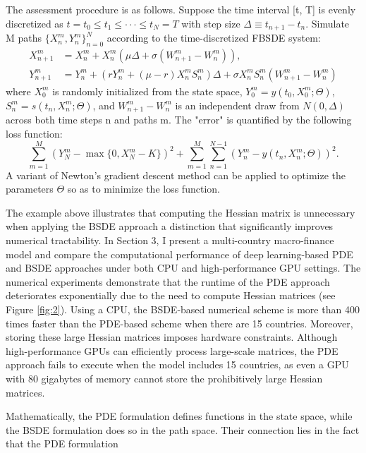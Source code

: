 \documentclass{article}
\begin{document}
The assessment procedure is as follows. Suppose the time interval [t, T] is evenly discretized as $t=t_{0}\le t_{1}\le\cdot\cdot\cdot\le t_{N}=T$ with step size $\Delta\equiv t_{n+1}-t_{n}$. Simulate M paths $\{X_{n}^{m},Y_{n}^{m}\}_{n=0}^{N}$ according to the time-discretized FBSDE system:
\begin{align*}
X_{n+1}^{m}&=X_{n}^{m}+X_{n}^{m}(\mu\Delta+\sigma(W_{n+1}^{m}-W_{n}^{m})), \\
Y_{n+1}^{m}&=Y_{n}^{m}+(rY_{n}^{m}+(\mu-r)X_{n}^{m}S_{n}^{m})\Delta+\sigma X_{n}^{m}S_{n}^{m}(W_{n+1}^{m}-W_{n}^{m})
\end{align*}
where $X_{0}^{m}$ is randomly initialized from the state space, $Y_{0}^{m}=y(t_{0},X_{0}^{m};\Theta)$, $S_{n}^{m}=s(t_{n},X_{n}^{m};\Theta)$, and $W_{n+1}^{m}-W_{n}^{m}$ is an independent draw from $N(0,\Delta)$ across both time steps n and paths m. The "error" is quantified by the following loss function:
\[
\sum_{m=1}^{M}(Y_{N}^{m}-\max\{0,X_{N}^{m}-K\})^{2}+\sum_{m=1}^{M}\sum_{n=1}^{N-1}(Y_{n}^{m}-y(t_{n},X_{n}^{m};\Theta))^{2}.
\]
A variant of Newton's gradient descent method can be applied to optimize the parameters $\Theta$ so as to minimize the loss function.

The example above illustrates that computing the Hessian matrix is unnecessary when applying the BSDE approach a distinction that significantly improves numerical tractability. In Section 3, I present a multi-country macro-finance model and compare the computational performance of deep learning-based PDE and BSDE approaches under both CPU and high-performance GPU settings. The numerical experiments demonstrate that the runtime of the PDE approach deteriorates exponentially due to the need to compute Hessian matrices (see Figure \ref{fig:2}). Using a CPU, the BSDE-based numerical scheme is more than 400 times faster than the PDE-based scheme when there are 15 countries. Moreover, storing these large Hessian matrices imposes hardware constraints. Although high-performance GPUs can efficiently process large-scale matrices, the PDE approach fails to execute when the model includes 15 countries, as even a GPU with 80 gigabytes of memory cannot store the prohibitively large Hessian matrices.

Mathematically, the PDE formulation defines functions in the state space, while the BSDE formulation does so in the path space. Their connection lies in the fact that the PDE formulation

\clearpage
\end{document}
